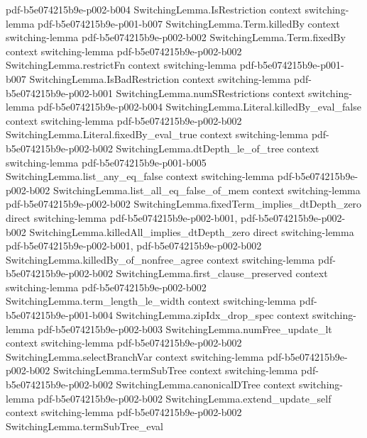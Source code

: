 \begin{lemma}
  {pdf-b5e074215b9e-p002-b004}
\proofstep
  {SwitchingLemma.IsRestriction}
  {context}
  {switching-lemma}
  {pdf-b5e074215b9e-p001-b007}
\proofstep
  {SwitchingLemma.Term.killedBy}
  {context}
  {switching-lemma}
  {pdf-b5e074215b9e-p002-b002}
\proofstep
  {SwitchingLemma.Term.fixedBy}
  {context}
  {switching-lemma}
  {pdf-b5e074215b9e-p002-b002}
\proofstep
  {SwitchingLemma.restrictFn}
  {context}
  {switching-lemma}
  {pdf-b5e074215b9e-p001-b007}
\proofstep
  {SwitchingLemma.IsBadRestriction}
  {context}
  {switching-lemma}
  {pdf-b5e074215b9e-p002-b001}
\proofstep
  {SwitchingLemma.numSRestrictions}
  {context}
  {switching-lemma}
  {pdf-b5e074215b9e-p002-b004}
\proofstep
  {SwitchingLemma.Literal.killedBy_eval_false}
  {context}
  {switching-lemma}
  {pdf-b5e074215b9e-p002-b002}
\proofstep
  {SwitchingLemma.Literal.fixedBy_eval_true}
  {context}
  {switching-lemma}
  {pdf-b5e074215b9e-p002-b002}
\proofstep
  {SwitchingLemma.dtDepth_le_of_tree}
  {context}
  {switching-lemma}
  {pdf-b5e074215b9e-p001-b005}
\proofstep
  {SwitchingLemma.list_any_eq_false}
  {context}
  {switching-lemma}
  {pdf-b5e074215b9e-p002-b002}
\proofstep
  {SwitchingLemma.list_all_eq_false_of_mem}
  {context}
  {switching-lemma}
  {pdf-b5e074215b9e-p002-b002}
\proofstep
  {SwitchingLemma.fixedTerm_implies_dtDepth_zero}
  {direct}
  {switching-lemma}
  {pdf-b5e074215b9e-p002-b001,
    pdf-b5e074215b9e-p002-b002}
\proofstep
  {SwitchingLemma.killedAll_implies_dtDepth_zero}
  {direct}
  {switching-lemma}
  {pdf-b5e074215b9e-p002-b001,
    pdf-b5e074215b9e-p002-b002}
\proofstep
  {SwitchingLemma.killedBy_of_nonfree_agree}
  {context}
  {switching-lemma}
  {pdf-b5e074215b9e-p002-b002}
\proofstep
  {SwitchingLemma.first_clause_preserved}
  {context}
  {switching-lemma}
  {pdf-b5e074215b9e-p002-b002}
\proofstep
  {SwitchingLemma.term_length_le_width}
  {context}
  {switching-lemma}
  {pdf-b5e074215b9e-p001-b004}
\proofstep
  {SwitchingLemma.zipIdx_drop_spec}
  {context}
  {switching-lemma}
  {pdf-b5e074215b9e-p002-b003}
\proofstep
  {SwitchingLemma.numFree_update_lt}
  {context}
  {switching-lemma}
  {pdf-b5e074215b9e-p002-b002}
\proofstep
  {SwitchingLemma.selectBranchVar}
  {context}
  {switching-lemma}
  {pdf-b5e074215b9e-p002-b002}
\proofstep
  {SwitchingLemma.termSubTree}
  {context}
  {switching-lemma}
  {pdf-b5e074215b9e-p002-b002}
\proofstep
  {SwitchingLemma.canonicalDTree}
  {context}
  {switching-lemma}
  {pdf-b5e074215b9e-p002-b002}
\proofstep
  {SwitchingLemma.extend_update_self}
  {context}
  {switching-lemma}
  {pdf-b5e074215b9e-p002-b002}
\proofstep
  {SwitchingLemma.termSubTree_eval}

\end{lemma}

